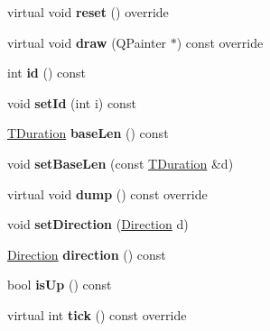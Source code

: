 \begin{DoxyCompactItemize}
virtual void {\bfseries reset} () override
\item 
\mbox{\label{class_ms_1_1_tuplet_adce8d84053eec2a6808627e29b94dc04}} 
virtual void {\bfseries draw} (Q\+Painter $\ast$) const override
\item 
\mbox{\label{class_ms_1_1_tuplet_a4408ddf3344d57422481183690e0c10e}} 
int {\bfseries id} () const
\item 
\mbox{\label{class_ms_1_1_tuplet_a62a15a8564ba477a5575b5ea306ea2c1}} 
void {\bfseries set\+Id} (int i) const
\item 
\mbox{\label{class_ms_1_1_tuplet_a28548e0ca46eaf9970fed3f7d3b51c58}} 
\hyperlink{class_ms_1_1_t_duration}{T\+Duration} {\bfseries base\+Len} () const
\item 
\mbox{\label{class_ms_1_1_tuplet_a1f6d0d4fbe2921476dc77bb9cf59f9e0}} 
void {\bfseries set\+Base\+Len} (const \hyperlink{class_ms_1_1_t_duration}{T\+Duration} \&d)
\item 
\mbox{\label{class_ms_1_1_tuplet_ab35cccae4d770e026ec4c4b20e8f2839}} 
virtual void {\bfseries dump} () const override
\item 
\mbox{\label{class_ms_1_1_tuplet_a63b32084eb54f2af5bfe694eb0f86700}} 
void {\bfseries set\+Direction} (\hyperlink{class_ms_1_1_direction}{Direction} d)
\item 
\mbox{\label{class_ms_1_1_tuplet_ad5571147b47f25370494415536733295}} 
\hyperlink{class_ms_1_1_direction}{Direction} {\bfseries direction} () const
\item 
\mbox{\label{class_ms_1_1_tuplet_a8eebb95946fc53ebe91714cbf1b5a732}} 
bool {\bfseries is\+Up} () const
\item 
\mbox{\label{class_ms_1_1_tuplet_ac28fc3a6bb026a9953a5267e20a4dc3a}} 
virtual int {\bfseries tick} () const override
\item 
\mbox{\label{class_ms_1_1_tuplet_a380e65672da55918c108804b16b5d9ac}} 

\end{DoxyCompactItemize}
